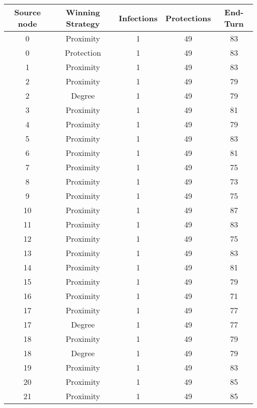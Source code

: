 \documentclass[results.tex]{subfiles}
\begin{document}
\begin{center}
  \begin{tabular}{| c || c | c | c | c |}
    \hline
    {\bfseries Source node} & {\bfseries Winning Strategy} & {\bfseries Infections} & {\bfseries Protections} & {\bfseries End-Turn} \\  %
    \hline\hline
    0 & Proximity & 1 & 49 & 83 \\ 
    \hline
    0 & Protection & 1 & 49 & 83 \\ 
    \hline
    1 & Proximity & 1 & 49 & 83 \\ 
    \hline
    2 & Proximity & 1 & 49 & 79 \\ 
    \hline
    2 & Degree & 1 & 49 & 79 \\ 
    \hline
    3 & Proximity & 1 & 49 & 81 \\ 
    \hline
    4 & Proximity & 1 & 49 & 79 \\ 
    \hline
    5 & Proximity & 1 & 49 & 83 \\ 
    \hline
    6 & Proximity & 1 & 49 & 81 \\ 
    \hline
    7 & Proximity & 1 & 49 & 75 \\ 
    \hline
    8 & Proximity & 1 & 49 & 73 \\ 
    \hline
    9 & Proximity & 1 & 49 & 75 \\ 
    \hline
    10 & Proximity & 1 & 49 & 87 \\ 
    \hline
    11 & Proximity & 1 & 49 & 83 \\ 
    \hline
    12 & Proximity & 1 & 49 & 75 \\ 
    \hline
    13 & Proximity & 1 & 49 & 83 \\ 
    \hline
    14 & Proximity & 1 & 49 & 81 \\ 
    \hline
    15 & Proximity & 1 & 49 & 79 \\ 
    \hline
    16 & Proximity & 1 & 49 & 71 \\ 
    \hline
    17 & Proximity & 1 & 49 & 77 \\ 
    \hline
    17 & Degree & 1 & 49 & 77 \\ 
    \hline
    18 & Proximity & 1 & 49 & 79 \\ 
    \hline
    18 & Degree & 1 & 49 & 79 \\ 
    \hline
    19 & Proximity & 1 & 49 & 83 \\ 
    \hline
    20 & Proximity & 1 & 49 & 85 \\ 
    \hline
    21 & Proximity & 1 & 49 & 85 \\ 

\end{tabular}
\end{center}
\end{document}
